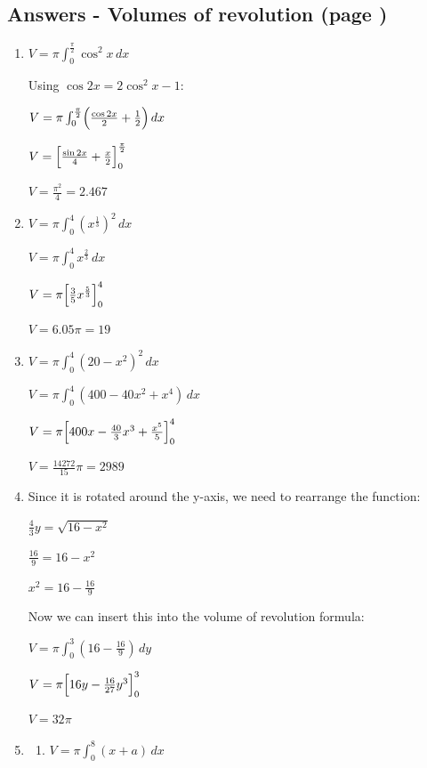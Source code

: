 \documentclass[../main.tex]{subfiles}
\begin{document}
\subsection*{Answers - Volumes of revolution (page \pageref{Volumes of revolution})}
\label{Volumes of revolution answers}
\begin{spacing}{1.5}

\begin{enumerate}[itemsep=0.7cm]
    \item 
    $V=\pi \int_0^{\frac{\pi}{2}} \cos^2{x}\,dx$

    Using $\cos{2x}=2\cos^2{x}-1$:

    $V=\pi \int_0^{\frac{\pi}{2}} \Bigl(\frac{\cos{2x}}{2}+\frac{1}{2}\Bigr)\, dx$

    $V=\Bigl[\frac{\sin{2x}}{4}+\frac{x}{2}\Bigr]_0^{\frac{\pi}{2}}$

    $V=\frac{\pi^2}{4}=2.467$

    \item 
    $V=\pi \int_0^4 (x^{\frac{1}{3}})^2\,dx$

    $V=\pi \int_0^4 x^{\frac{2}{3}}\, dx$

    $V=\pi \Bigl[\frac{3}{5}x^{\frac{5}{3}} \Bigr]_0^4$

    $V=6.05\pi = 19$

    \item
    $V=\pi \int_0^4 (20-x^2)^2\, dx$

    $V=\pi \int_0^4 (400-40x^2+x^4)\,dx$

    $V=\pi \Bigl[400x-\frac{40}{3}x^3+\frac{x^5}{5} \Bigr]_0^4$

    $V=\frac{14272}{15}\pi=2989$

    \item 
    Since it is rotated around the y-axis, we need to rearrange the function:

    $\frac{4}{3}y=\sqrt{16-x^2}$

    $\frac{16}{9}=16-x^2$

    $x^2=16-\frac{16}{9}$

    Now we can insert this into the volume of revolution formula:

    $V=\pi \int_0^3 (16-\frac{16}{9})\,dy$

    $V=\pi \Bigl[16y-\frac{16}{27}y^3\Bigr]_0^3$

    $V=32\pi$

    \item 
    
    \begin{enumerate}
        \item 
        $V=\pi \int_0^8 (x+a)\,dx$


\end{enumerate}
\end{enumerate}
\end{spacing}
\end{document}
